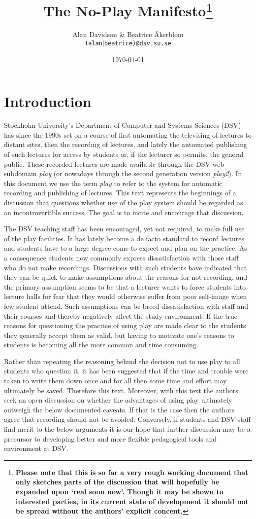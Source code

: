 \documentclass[a4paper,10pt]{article}
\title{The No-Play Manifesto\footnote{\textbf{Please note that this is so far a very rough working document that only sketches parts of the discussion that will hopefully be expanded upon `real soon now'. Though it may be shown to interested parties, in its current state of development it should not be spread without the authors' explicit concent. }}}
\author{Alan Davidson \& Beatrice Åkerblom\\ 
  \texttt{(alan$|$beatrice)@dsv.su.se}}
\date{\today}
\begin{document}
\maketitle
\tableofcontents

\section{Introduction}


Stockholm University's Department of Computer and Systems Sciences (DSV) has since the 1990s set on a course of first automating the televising of lectures to distant sites, then the recording of lectures, and lately the automated publishing of such lectures for access by students or, if the lecturer so permits, the general public. These recorded lectures are made available through the DSV web subdomain \emph{play} (or nowadays through the second generation version \emph{play2}). In this document we use the term \emph{play} to refer to the system for automatic recording and publishing of lectures. This text represents the beginnings of a discussion that questions whether use of the play system should be regarded as an incontrovertible success.  The goal is to incite and encourage that discussion. 

The DSV teaching staff has been encouraged, yet not required, to make full use of the play facilities. It has lately become a de facto standard to record lectures and students have to a large degree come to expect and plan on the practice. As a consequence students now commonly express dissatisfaction with those staff who do not make recordings. Discussions with such students have indicated that they can be quick to make assumptions about the reasons for not recording, and the primary assumption seems to be that a lecturer wants to force students into lecture halls for fear that they would otherwise suffer from poor self-image when few student attend. Such assumptions can be breed dissatisfaction with staff and their courses and thereby negatively affect the study environment. If the true reasons for questioning the practice of using play are made clear to the students they generally accept them as valid, but having to motivate one's reasons to students is becoming all the more common and time consuming.

Rather than repeating the reasoning behind the decision not to use play to all students who question it, it has been suggested that if the time and trouble were taken to write them down once and for all then some time and effort may ultimately be saved. Therefore this text. Moreover, with this text the authors seek an open discussion on whether the advantages of using play ultimately outweigh the below documented caveats. If that is the case then the authors agree that recording should not be avoided. Conversely, if students and DSV staff find merit to the below arguments it is our hope that further discussion may be a precursor to developing better and more flexible pedagogical tools and environment at DSV.
\end{document}
